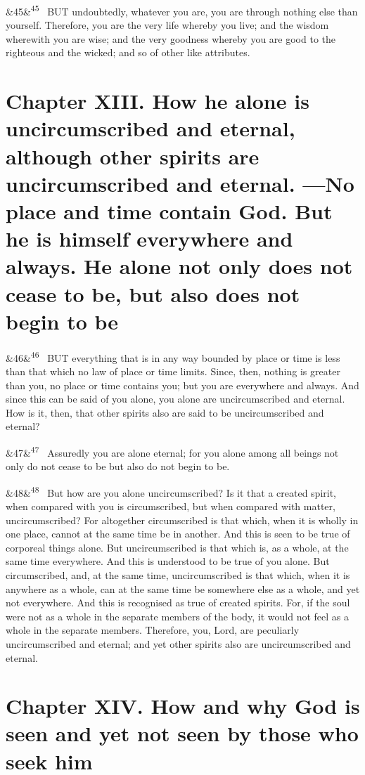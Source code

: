 \documentclass[12pt]{article}
\newcommand{\para}[1][]{\par\noindent\ifx&#1&\else\textsuperscript{\footnotesize #1}~\fi}
\begin{document}
\para[45] BUT undoubtedly, whatever you are, you are through nothing else than yourself. Therefore, you are the very life whereby you live; and the wisdom wherewith you are wise; and the very goodness whereby you are good to the righteous and the wicked; and so of other like attributes.


\section*{Chapter XIII. How he alone is uncircumscribed and eternal, although other spirits are uncircumscribed and eternal. ---No place and time contain God. But he is himself everywhere and always. He alone not only does not cease to be, but also does not begin to be}

\para[46] BUT everything that is in any way bounded by place or time is less than that which no law of place or time limits. Since, then, nothing is greater than you, no place or time contains you; but you are everywhere and always. And since this can be said of you alone, you alone are uncircumscribed and eternal. How is it, then, that other spirits also are said to be uncircumscribed and eternal?

\para[47] Assuredly you are alone eternal; for you alone among all beings not only do not cease to be but also do not begin to be.

\para[48] But how are you alone uncircumscribed? Is it that a created spirit, when compared with you is circumscribed, but when compared with matter, uncircumscribed? For altogether circumscribed is that which, when it is wholly in one place, cannot at the same time be in another. And this is seen to be true of corporeal things alone. But uncircumscribed is that which is, as a whole, at the same time everywhere. And this is understood to be true of you alone. But circumscribed, and, at the same time, uncircumscribed is that which, when it is anywhere as a whole, can at the same time be somewhere else as a whole, and yet not everywhere. And this is recognised as true of created spirits. For, if the soul were not as a whole in the separate members of the body, it would not feel as a whole in the separate members. Therefore, you, Lord, are peculiarly uncircumscribed and eternal; and yet other spirits also are uncircumscribed and eternal.


\section*{Chapter XIV. How and why God is seen and yet not seen by those who seek him}
\end{document}
